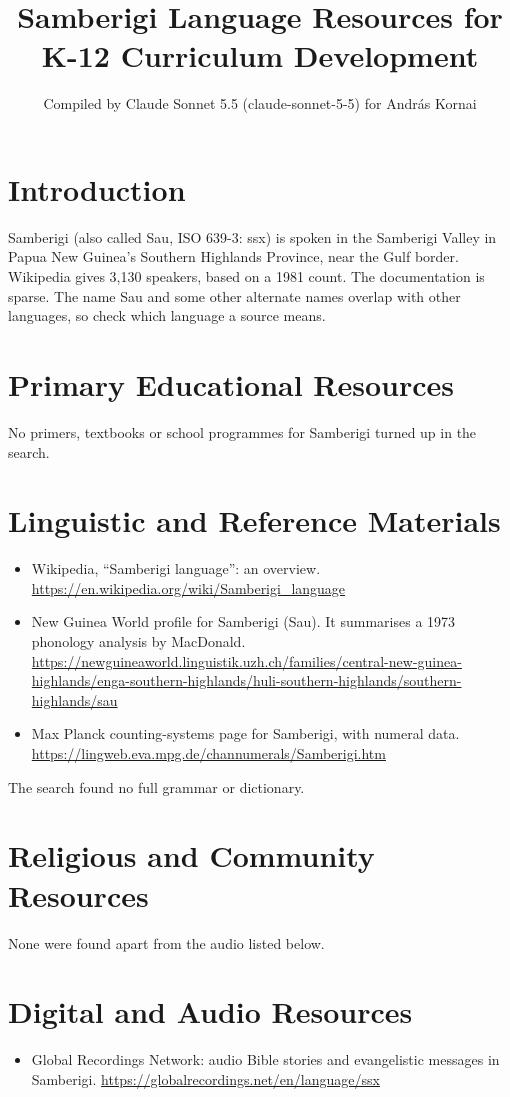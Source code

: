\documentclass[12pt]{article}
\title{Samberigi Language Resources for K-12 Curriculum Development}
\author{Compiled by Claude Sonnet 5.5 (claude-sonnet-5-5) for Andr\'as Kornai}
\date{}
\begin{document}
\maketitle

\section{Introduction}
Samberigi (also called Sau, ISO 639-3: ssx) is spoken in the Samberigi Valley in Papua New Guinea's Southern Highlands Province, near the Gulf border. Wikipedia gives 3,130 speakers, based on a 1981 count. The documentation is sparse. The name Sau and some other alternate names overlap with other languages, so check which language a source means.

\section{Primary Educational Resources}
No primers, textbooks or school programmes for Samberigi turned up in the search.

\section{Linguistic and Reference Materials}
\begin{itemize}
\item Wikipedia, ``Samberigi language'': an overview. \url{https://en.wikipedia.org/wiki/Samberigi_language}
\item New Guinea World profile for Samberigi (Sau). It summarises a 1973 phonology analysis by MacDonald. \url{https://newguineaworld.linguistik.uzh.ch/families/central-new-guinea-highlands/enga-southern-highlands/huli-southern-highlands/southern-highlands/sau}
\item Max Planck counting-systems page for Samberigi, with numeral data. \url{https://lingweb.eva.mpg.de/channumerals/Samberigi.htm}
\end{itemize}
The search found no full grammar or dictionary.

\section{Religious and Community Resources}
None were found apart from the audio listed below.

\section{Digital and Audio Resources}
\begin{itemize}
\item Global Recordings Network: audio Bible stories and evangelistic messages in Samberigi. \url{https://globalrecordings.net/en/language/ssx}
\end{itemize}
\end{document}
